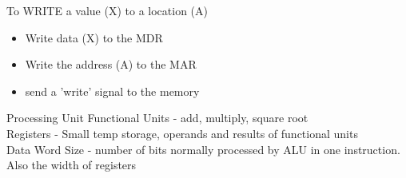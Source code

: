 \documentclass{article}
\begin{document}
To WRITE a value (X) to a location (A)
\begin{itemize}
  \item Write data (X) to the MDR
  \item Write the address (A) to the MAR
  \item send a 'write' signal to the memory
\end{itemize}

\noindent
\Large
Processing Unit
\normalsize
\noindent
Functional Units - add, multiply, square root\\
Registers - Small temp storage, operands and results of functional units\\
Data Word Size - number of bits normally processed by ALU in one instruction. Also the width of registers\\
\end{document}
